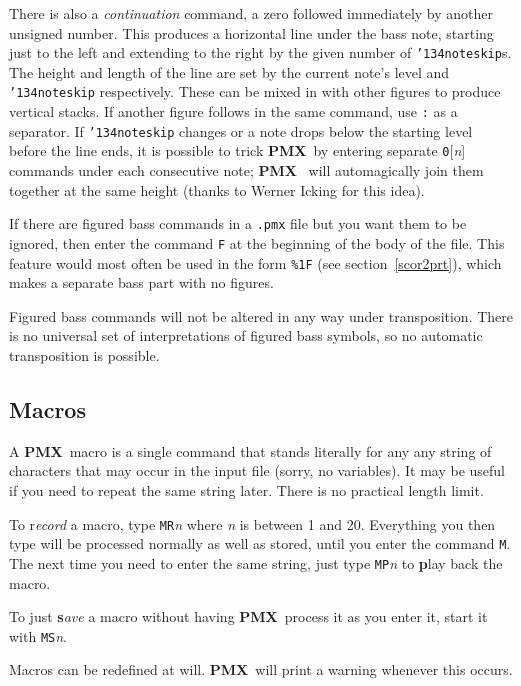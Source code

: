 \documentclass[11pt]{article}
\def\bs{{\tt\char'134}}
\newcommand\PMXX{\textbf{PMX}}
\newcommand\PMX{\PMXX~}
\def\newfrom{2.59}  %
\def\NEW#1{\ifdim#1 pt<\newfrom pt\else%
\marginpar{\fbox{#1}}\fi}
\begin{document}
	There is also a {\it continuation} command, a zero followed immediately 
by another \NEW{2.4} 
unsigned number.  This produces a horizontal line under the bass note, starting 
just to the left and extending to the right by the given number of 
\bs{\tt noteskip}s.  The height and length of the line are set by the current 
note's level and \bs{\tt noteskip} respectively. These \NEW{2.4} can be mixed in with
other figures to produce vertical stacks.  If another figure follows in the
same command, use {\tt:} as a separator.  
If \bs{\tt noteskip} changes or a note drops 
below the starting level before the line ends, it is possible to trick 
\PMX by entering separate {\tt 0}[{\it n}] commands under each consecutive note; \PMX 
will automagically join them together at the same height 
(thanks to Werner Icking for this idea).  

	If there are figured bass commands in a {\tt .pmx} file but 
you want them to be ignored, then enter the command {\tt F} at the 
beginning of the body of the file.  This feature would most often be 
used in the form {\tt \%1F} 
(see section~\ref{scor2prt}), which makes a 
separate bass part with no figures.

        Figured bass commands will not be altered in any way under 
transposition.  There is no universal set of interpretations of figured bass 
symbols, so no automatic transposition is possible.

\subsection{Macros}

     A \PMX macro is a single command that stands literally for any 
any string of characters that may occur in the input file (sorry, no 
variables). It may be useful if you need to repeat the same string later.
There is no practical length limit.    

To 
{\bfi r}{\it ecord} a macro, type {\tt MR}{\it n} where {\it n} is between 
1 and 20.  
Everything you then type will be processed normally as well as stored, 
until you enter the command {\tt M}.  The next time you need to enter the same 
string, just type {\tt MP}{\it n} to {\bf p}lay back the macro.  
  
To just {\bf s}{\it ave} a macro without having \PMX process it as you
enter it, start it with {\tt MS}{\it n}.  

Macros can be redefined at will.  \PMX will print a warning whenever this
occurs.
\end{document}
